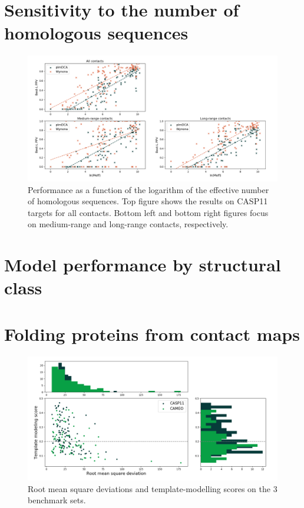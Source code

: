         \todo{}

\section{Sensitivity to the number of homologous sequences}

    \begin{figure}[H]
        \begin{center}
            \includegraphics[width=\textwidth, keepaspectratio]{imgs/Meff.png}
            \caption{Performance as a function of the logarithm of the effective
            number of homologous sequences. Top figure shows the results on
            CASP11 targets for all contacts. Bottom left and bottom right figures
            focus on medium-range and long-range contacts, respectively.}
            \label{sensitivity}
        \end{center}
    \end{figure}

\section{Model performance by structural class}

\section{Folding proteins from contact maps}

    \begin{figure}[H]
        \begin{center}
            \includegraphics[width=\textwidth, keepaspectratio]{imgs/fold.png}
            \caption{Root mean square deviations and template-modelling scores
            on the 3 benchmark sets.}
            \label{fold}
        \end{center}
    \end{figure}

